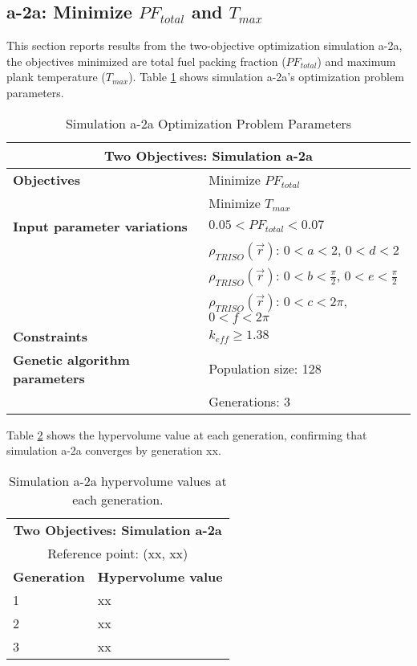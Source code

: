 \subsection{a-2a: Minimize $PF_{total}$ and $T_{max}$}
\label{sec:a-2a}
This section reports results from the two-objective optimization simulation a-2a, the 
objectives minimized are total fuel packing fraction ($PF_{total}$) and maximum plank
temperature ($T_{max}$).  
Table \ref{tab:simulationa2a} shows simulation a-2a's optimization problem parameters. 
\begin{table}[htbp!]
    \centering
    \onehalfspacing
    \caption{Simulation a-2a Optimization Problem Parameters}
	\label{tab:simulationa2a}
    \footnotesize
    \begin{tabular}{l|p{5.3cm}}
    \hline 
    \multicolumn{2}{c}{\textbf{Two Objectives: Simulation a-2a}} \\
    \hline 
    \textbf{Objectives} & Minimize $PF_{total}$ \\
    & Minimize $T_{max}$ \\
    \hline 
    \textbf{Input parameter variations} & $0.05<PF_{total}<0.07$ \\
    & $\rho_{TRISO}(\vec{r})$: $0<a<2$, $0<d<2$\\
    & $\rho_{TRISO}(\vec{r})$: $0<b<\frac{\pi}{2}$, $0<e<\frac{\pi}{2}$\\
    & $\rho_{TRISO}(\vec{r})$: $0<c<2\pi$, $0<f<2\pi$\\
    \hline
    \textbf{Constraints} & $k_{eff} \geq 1.38$\\ 
    \hline 
    \textbf{Genetic algorithm parameters} & Population size: 128 \\
    & Generations: 3 \\
    \hline
    \end{tabular}
\end{table}

Table \ref{tab:a2a-hypervolume} shows the hypervolume value at each generation, 
confirming that simulation a-2a converges by generation xx. 
\begin{table}[htbp!]
    \centering
    \onehalfspacing
    \caption{Simulation a-2a hypervolume values at each generation.}
	\label{tab:a2a-hypervolume}
    \footnotesize
    \begin{tabular}{ll}
    \hline 
    \multicolumn{2}{c}{\textbf{Two Objectives: Simulation a-2a}} \\
    \multicolumn{2}{c}{Reference point: (xx, xx)} \\
    \hline 
    \textbf{Generation} & \textbf{Hypervolume value} \\
    \hline
    1 & xx \\
    2 & xx \\
    3 & xx \\
    \hline
    \end{tabular}
\end{table}


